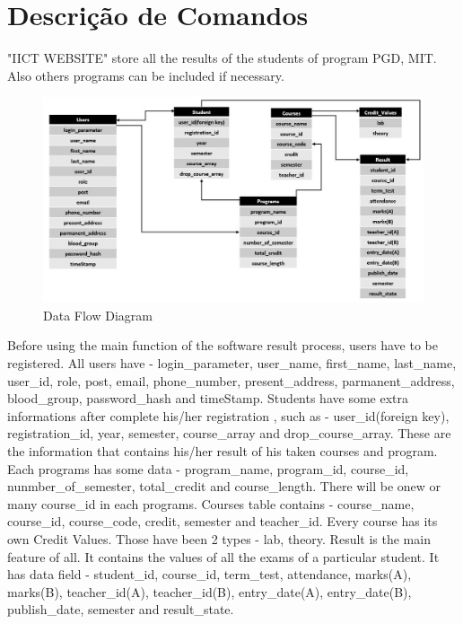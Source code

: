 \documentclass{scrreprt}
\begin{document}
\section{Descrição de Comandos}
"IICT WEBSITE" store all the results of the students of program PGD, MIT. Also others programs can be included if necessary.
\begin{figure}[h!]
    \centering
    \includegraphics[width=15cm]{3.JPG}
    \caption{Data Flow Diagram}
    \label{fig:Data Flow Diagram}
\end{figure}
Before using the main function of the software result process, users have to be registered. 
\newline
All users have - login\_parameter, user\_name, first\_name, last\_name, user\_id, role, post, email, phone\_number, present\_address, parmanent\_address, blood\_group, password\_hash and timeStamp.
\newline
Students have some extra informations after complete his/her registration , such as - user\_id(foreign key), registration\_id, year, semester, course\_array and drop\_course\_array. These are the information that contains his/her result of his taken courses and program.
\newline
Each programs has some data - program\_name, program\_id, course\_id, nunmber\_of\_semester, total\_credit and course\_length. There will be onew or many course\_id in each programs.
\newline
Courses table contains - course\_name, course\_id, course\_code, credit, semester and teacher\_id.
\newline
Every course has its own Credit Values. Those have been 2 types - lab, theory.
\newline
Result is the main feature of all. It contains the values of all the exams of a particular student. It has data field - student\_id, course\_id, term\_test, attendance, marks(A), marks(B), teacher\_id(A), teacher\_id(B), entry\_date(A), entry\_date(B), publish\_date, semester	and result\_state.
\end{document}
